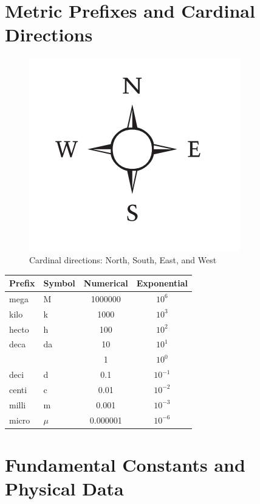 \documentclass[12pt,a4paper]{article}
\begin{document}
\section{Metric Prefixes and Cardinal Directions}
\begin{figure}[H]
    \centering
    \includegraphics[width=0.4\linewidth]{phys12-navigation-compass-directions.png}
    \caption{Cardinal directions: North, South, East, and West}
    \label{fig:Cardinal directions}
\end{figure}

\begin{table}[H]
\centering
\begin{tabular}{@{}llcc@{}}
\toprule
Prefix & Symbol & Numerical & Exponential \\
\midrule
mega & M & 1000000 & $10^6$ \\
kilo & k & 1000 & $10^3$ \\
hecto & h & 100 & $10^2$ \\
deca & da & 10 & $10^1$ \\
 &  & 1 & $10^0$ \\
deci & d & 0.1 & $10^{-1}$ \\
centi & c & 0.01 & $10^{-2}$ \\
milli & m & 0.001 & $10^{-3}$ \\
micro & $\mu$ & 0.000001 & $10^{-6}$ \\
\bottomrule
\end{tabular}
\end{table}

\section{Fundamental Constants and Physical Data}
\end{document}
